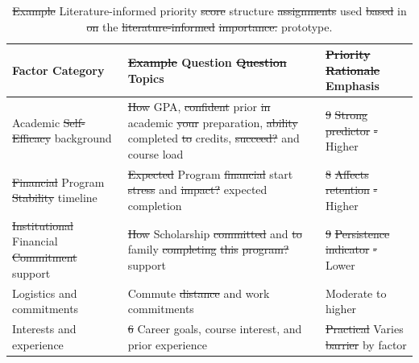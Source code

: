 \documentclass[letterpaper,11pt]{article}
\newcommand{\DIFdel}[1]{%
  \begingroup\setlength{\fboxsep}{0.5pt}%
  \colorbox{diffdelbg}{\textcolor{diffdeltext}{\sout{#1}}}%
  \endgroup}
\newcommand{\DIFadd}[1]{%
  \begingroup\setlength{\fboxsep}{0.5pt}%
  \colorbox{diffaddbg}{\textcolor{diffaddtext}{#1}}%
  \endgroup}
\newcommand{\DIFdelcite}[1]{%
  \DIFdel{-}\textcolor{diffdeltext}{#1}}
\begin{document}
\begin{table}[htbp]

\caption{\DIFdel{Example} \DIFadd{Literature-informed} priority \DIFdel{score} \DIFadd{structure} \DIFdel{assignments} \DIFadd{used} \DIFdel{based} \DIFadd{in} \DIFdel{on} \DIFadd{the} \DIFdel{literature-informed} \DIFdel{importance.} \DIFadd{prototype.}}
\label{tab:priority}
 \centering
\begin{tabular}{@{}p{3.4cm}p{8.0cm}p{2.4cm}@{}}
\toprule
\textbf{Factor Category} & \textbf{\DIFdel{Example} \DIFadd{Question} \DIFdel{Question} \DIFadd{Topics}} & \textbf{\DIFdel{Priority}  \DIFdel{Rationale} \DIFadd{Emphasis}} \\
\midrule
Academic          \DIFdel{Self-Efficacy} \DIFadd{background} & \DIFdel{How} \DIFadd{GPA,} \DIFdel{confident} \DIFadd{prior} \DIFdel{in} \DIFadd{academic} \DIFdel{your} \DIFadd{preparation,} \DIFdel{ability} \DIFadd{completed} \DIFdel{to} \DIFadd{credits,} \DIFdel{succeed?} \DIFadd{and} \DIFadd{course} \DIFadd{load} & \DIFdel{9}  \DIFdel{Strong} \DIFdel{predictor} \DIFdelcite{\parencite{bandura1997}} \DIFadd{Higher} \\
\addlinespace[2pt]
\DIFdel{Financial} \DIFadd{Program} \DIFdel{Stability} \DIFadd{timeline} & \DIFdel{Expected} \DIFadd{Program} \DIFdel{financial} \DIFadd{start} \DIFdel{stress} \DIFadd{and} \DIFdel{impact?} \DIFadd{expected} \DIFadd{completion} & \DIFdel{8}  \DIFdel{Affects} \DIFdel{retention} \DIFdelcite{\parencite{socialcognitive2022}} \DIFadd{Higher} \\
\addlinespace[2pt]
\DIFdel{Institutional} \DIFadd{Financial} \DIFdel{Commitment} \DIFadd{support} & \DIFdel{How} \DIFadd{Scholarship} \DIFdel{committed} \DIFadd{and} \DIFdel{to} \DIFadd{family} \DIFdel{completing} \DIFdel{this} \DIFdel{program?} \DIFadd{support} & \DIFdel{9}  \DIFdel{Persistence} \DIFdel{indicator} \DIFdelcite{\parencite{tinto1993}} \DIFadd{Lower} \\
\addlinespace[2pt]
Logistics \DIFadd{and} \DIFadd{commitments} & Commute \DIFdel{distance} \DIFadd{and} \DIFadd{work} \DIFadd{commitments} & \DIFadd{Moderate} to higher \\
\addlinespace[2pt]
Interests and experience & \DIFdel{6} \DIFadd{Career} \DIFadd{goals,} \DIFadd{course} \DIFadd{interest,} \DIFadd{and} \DIFadd{prior} \DIFadd{experience} & \DIFdel{Practical} \DIFadd{Varies} \DIFdel{barrier} \DIFadd{by} \DIFadd{factor} \\
\bottomrule
\end{tabular}
\end{table}
\end{document}
